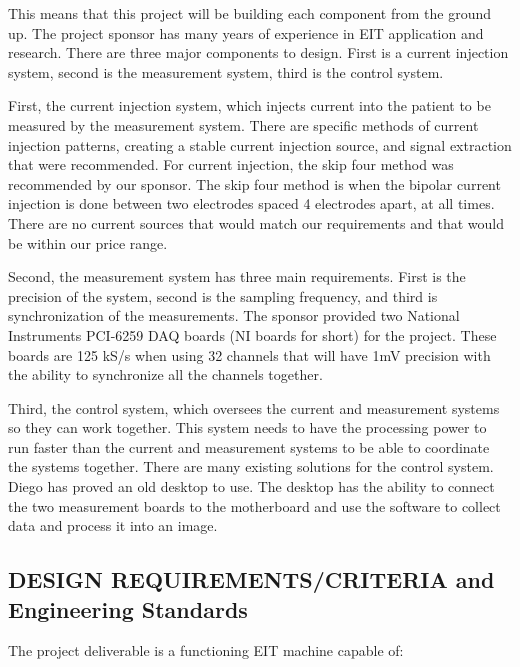 This means that this project will be building each component from the
ground up. The project sponsor has many years of experience in EIT
application and research. There are three major components to design.
First is a current injection system, second is the measurement system,
third is the control system.

First, the current injection system, which injects current into the
patient to be measured by the measurement system. There are specific
methods of current injection patterns, creating a stable current
injection source, and signal extraction that were recommended. For
current injection, the skip four method was recommended by our sponsor.
The skip four method is when the bipolar current injection is done
between two electrodes spaced 4 electrodes apart, at all times. There
are no current sources that would match our requirements and that would
be within our price range.

Second, the measurement system has three main requirements. First is the
precision of the system, second is the sampling frequency, and third is
synchronization of the measurements. The sponsor provided two National
Instruments PCI-6259 DAQ boards (NI boards for short) for the project.
These boards are 125 kS/s when using 32 channels that will have 1mV
precision with the ability to synchronize all the channels together.

Third, the control system, which oversees the current and measurement
systems so they can work together. This system needs to have the
processing power to run faster than the current and measurement systems
to be able to coordinate the systems together. There are many existing
solutions for the control system. Diego has proved an old desktop to
use. The desktop has the ability to connect the two measurement boards
to the motherboard and use the software to collect data and process it
into an image.

\subsection{DESIGN REQUIREMENTS/CRITERIA and Engineering Standards}
The project deliverable is a functioning EIT machine capable of:

